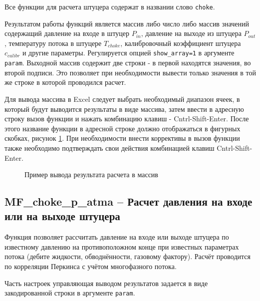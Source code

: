 Все функции для расчета штуцера содержат в названии слово \texttt{choke}. 
 
Результатом работы функций является массив либо число либо массив значений содержащий давление на входе в штуцер $P_{in}$, давление на выходе из штуцера $P_{out}$, температуру потока в штуцере $T_{choke}$, калибровочный коэффициент штуцера $c_{calibr}$ и другие параметры. Регулируется опцией \texttt{show_array=1} в аргументе \texttt{param}.  Выходной массив содержит две строки - в первой находятся значения, во второй подписи. Это позволяет при необходимости вывести только значения в той же строке в которой проводился расчет. 

Для вывода массива в Excel следует выбрать необходимый диапазон ячеек, в который будут выводится результаты в виде массива, затем ввести в адресную строку вызов функции и нажать комбинацию клавиш - Cntrl-Shift-Enter. После этого название функции в адресной строке должно отображаться в фигурных скобках, рисунок \ref{ris:choke_array_out}. При необходимости внести коррективы в вызов функции также необходимо подтверждать свои действия комбинацией клавиш Cntrl-Shift-Enter.


\begin{figure}[ht]
	\caption{Пример вывода результата расчета в массив}
	\label{ris:choke_array_out}
\end{figure}


\subsection{MF\_choke\_p\_atma – Расчет давления на входе или на выходе штуцера}
Функция позволяет рассчитать давление на входе или выходе штуцера по известному давлению на противоположном конце при известных параметрах потока (дебите жидкости, обводнённости, газовому фактору). Расчёт проводится по корреляции Перкинса \cite{Perkins_1993} с учётом многофазного потока. 
 

Часть настроек управляющая выводом результатов задается в виде закодированной строки в аргументе \texttt{param}.

